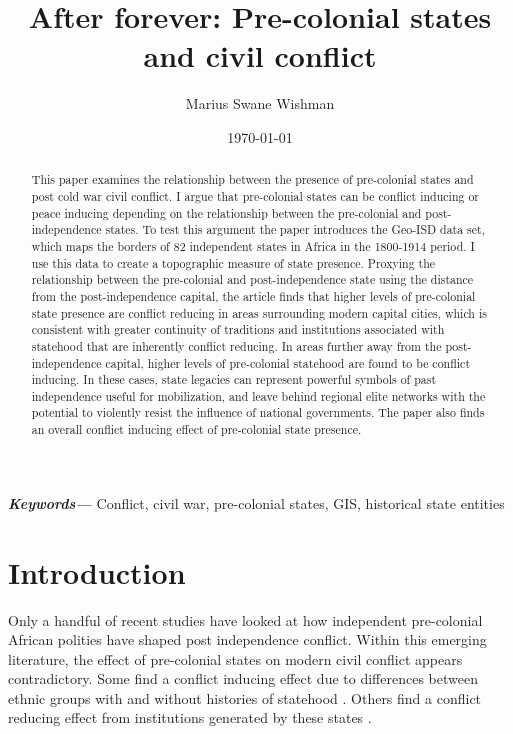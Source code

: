\documentclass[12pt]{article}
\title{After forever: Pre-colonial states and civil conflict}
\author[1]{Marius Swane Wishman}
\affil[1]{Department of Sociology and Political Science, NTNU}
\date{\today}
\providecommand{\keywords}[1]
{
	\small	
	\textbf{\textit{Keywords---}} #1
}
\begin{document}
\maketitle

\begin{abstract}

This paper examines the relationship between the presence of pre-colonial states
and post cold war civil conflict. I argue that pre-colonial states can be
conflict inducing or peace inducing depending on the relationship between the
pre-colonial and post-independence states. To test this argument the paper
introduces the Geo-ISD data set, which maps the borders of 82 independent states
in Africa in the 1800-1914 period. I use this data to create a topographic
measure of state presence. Proxying the relationship between the pre-colonial
and post-independence state using the distance from the post-independence
capital, the article finds that higher levels of pre-colonial state presence are
conflict reducing in areas surrounding modern capital cities, which is
consistent with greater continuity of traditions and institutions associated
with statehood that are inherently conflict reducing. In areas further away from
the post-independence capital, higher levels of pre-colonial statehood are found
to be conflict inducing. In these cases, state legacies can represent powerful
symbols of past independence useful for mobilization, and leave behind regional
elite networks with the potential to violently resist the influence of national
governments. The paper also finds an overall conflict inducing effect of
pre-colonial state presence.

\end{abstract}

\keywords{Conflict, civil war, pre-colonial states, GIS, historical state
entities}


\onehalfspacing


\newpage

\section{Introduction} \label{Introduction}

Only a handful of recent studies have looked at how independent pre-colonial
African polities have shaped post independence conflict. Within this emerging
literature, the effect of pre-colonial states on modern civil conflict appears
contradictory. Some find a conflict inducing effect due to differences between
ethnic groups with and without histories of statehood \citep{Englebert2002,
Paine2019}. Others find a conflict reducing effect from institutions generated
by these states \citep{Depetris-Chauvin2016, Wig2016}.
\end{document}
